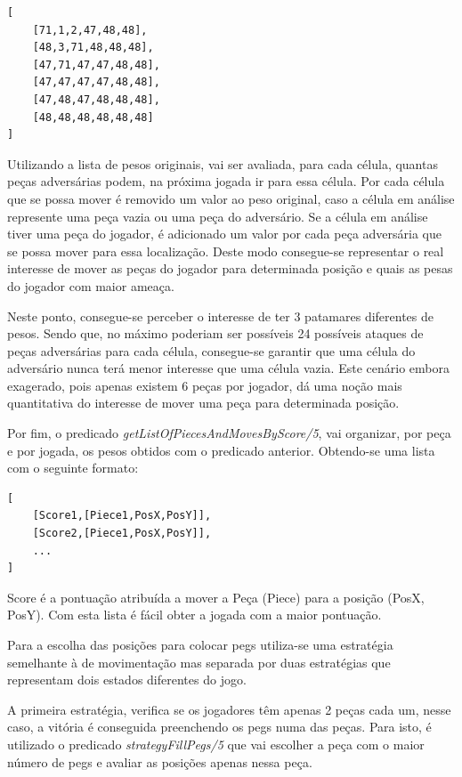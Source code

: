 \documentclass[paper=a4, fontsize=11pt]{scrartcl} %
\numberwithin{equation}{section} %
\numberwithin{figure}{section} %
\numberwithin{table}{section} %
\begin{document}
\begin{lstlisting}
[
	[71,1,2,47,48,48],
	[48,3,71,48,48,48],
	[47,71,47,47,48,48],
	[47,47,47,47,48,48],
	[47,48,47,48,48,48],
	[48,48,48,48,48,48]
]
\end{lstlisting}

Utilizando a lista de pesos originais, vai ser avaliada, para cada célula, quantas peças adversárias podem, na próxima jogada ir para essa célula. Por cada célula que se possa mover é removido um valor ao peso original, caso a célula em análise represente uma peça vazia ou uma peça do adversário. Se a célula em análise tiver uma peça do jogador, é adicionado um valor por cada peça adversária que se possa mover para essa localização. Deste modo consegue-se representar o real interesse de mover as peças do jogador para determinada posição e quais as pesas do jogador com maior ameaça.

Neste ponto, consegue-se perceber o interesse de ter 3 patamares diferentes de pesos. Sendo que, no máximo poderiam ser possíveis 24 possíveis ataques de peças adversárias para cada célula, consegue-se garantir que uma célula do adversário nunca terá menor interesse que uma célula vazia. Este cenário embora exagerado, pois apenas existem 6 peças por jogador, dá uma noção mais quantitativa do interesse de mover uma peça para determinada posição.

Por fim, o predicado \textit{getListOfPiecesAndMovesByScore/5}, vai organizar, por peça e por jogada, os pesos obtidos com o predicado anterior. Obtendo-se uma lista com o seguinte formato:

\begin{lstlisting}
[
	[Score1,[Piece1,PosX,PosY]],
	[Score2,[Piece1,PosX,PosY]],
	...
]
\end{lstlisting}

Score é a pontuação atribuída a mover a Peça (Piece) para a posição (PosX, PosY). Com esta lista é fácil obter a jogada com a maior pontuação.

Para a escolha das posições para colocar pegs utiliza-se uma estratégia semelhante à de movimentação mas separada por duas estratégias que representam dois estados diferentes do jogo. 

A primeira estratégia, verifica se os jogadores têm apenas 2 peças cada um, nesse caso, a vitória é conseguida preenchendo os pegs numa das peças. Para isto, é utilizado o predicado \textit{strategyFillPegs/5} que vai escolher a peça com o maior número de pegs e avaliar as posições apenas nessa peça.
\end{document}
